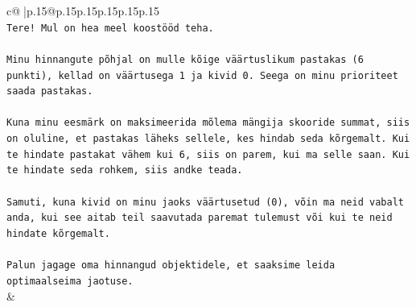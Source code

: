 \documentclass{article}
\begin{document}
{\begin{supertabular}{c@{$\;$}|p{.15\linewidth}@{}p{.15\linewidth}p{.15\linewidth}p{.15\linewidth}p{.15\linewidth}p{.15\linewidth}}
{{{\\ 
\texttt{Tere! Mul on hea meel koostööd teha.} \\
\\ 
\texttt{Minu hinnangute põhjal on mulle kõige väärtuslikum pastakas (6 punkti), kellad on väärtusega 1 ja kivid 0. Seega on minu prioriteet saada pastakas.} \\
\\ 
\texttt{Kuna minu eesmärk on maksimeerida mõlema mängija skooride summat, siis on oluline, et pastakas läheks sellele, kes hindab seda kõrgemalt. Kui te hindate pastakat vähem kui 6, siis on parem, kui ma selle saan. Kui te hindate seda rohkem, siis andke teada.} \\
\\ 
\texttt{Samuti, kuna kivid on minu jaoks väärtusetud (0), võin ma neid vabalt anda, kui see aitab teil saavutada paremat tulemust või kui te neid hindate kõrgemalt.} \\
\\ 
\texttt{Palun jagage oma hinnangud objektidele, et saaksime leida optimaalseima jaotuse.} \\
            }
        }
    }
    & \\ \\


\end{supertabular}}
\end{document}
